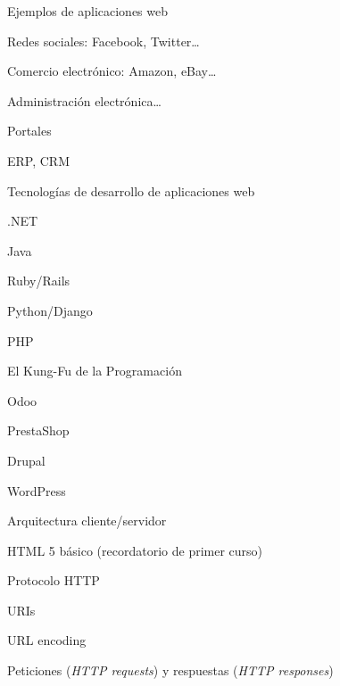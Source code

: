 \begin{longenum}
\begin{longenum}
\begin{longenum}
\begin{longenum}
            \end{longenum}
            \item Ejemplos de aplicaciones web
            \begin{longenum}
                \item Redes sociales: Facebook, Twitter…
                \item Comercio electrónico: Amazon, eBay…
                \item Administración electrónica…
                \item Portales
                \item ERP, CRM
            \end{longenum}
            \item Tecnologías de desarrollo de aplicaciones web
            \begin{longenum}
                \item .NET
                \item Java
                \item Ruby/Rails
                \item Python/Django
                \item PHP
                \item El Kung-Fu de la Programación
                \begin{longenum}
                    \item Odoo
                    \item PrestaShop
                    \item Drupal
                    \item WordPress
                \end{longenum}
            \end{longenum}
        \end{longenum}
        \item Arquitectura cliente/servidor
        \item HTML 5 básico (recordatorio de primer curso)
        \item Protocolo HTTP
        \begin{longenum}
            \item URIs
            \begin{longenum}
                \item URL encoding
            \end{longenum}
            \item Peticiones (\textit{HTTP requests}) y respuestas (\textit{HTTP responses})

\end{longenum}
\end{longenum}
\end{longenum}

